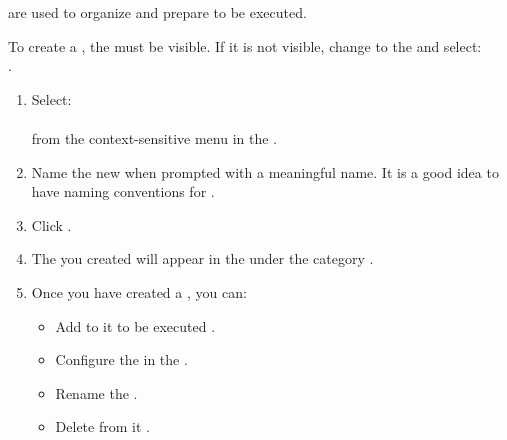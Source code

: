 
\gdsuites{} are used to organize and prepare \gdcases{} to be executed. 

To create a \gdsuite{}, the \gdtestsuitebrowser{} must be visible.
 If it is not visible, change to the \specpersp{} and select:\\
.

\begin{enumerate}
\item Select:\\
\\
from the context-sensitive menu in the \gdtestsuitebrowser{}. 

 \item Name  the new \gdsuite{} when prompted with a meaningful name. It is a good idea to have naming conventions  for \gdsuites{}. 
\item Click . 
\item The \gdsuite{} you created will appear in the \gdtestsuitebrowser{} under the category \bxname{\gdsuites{}}. 
\item Once you have created a \gdsuite{}, you can:
\begin{itemize}
\item Add \gdcases{} to it to be executed .
\item Configure the \gdsuite{} in the \gdpropview{} .
\item Rename the \gdsuite{} .
\item Delete \gdcases{} from it .
\end{itemize}
\end{enumerate}



